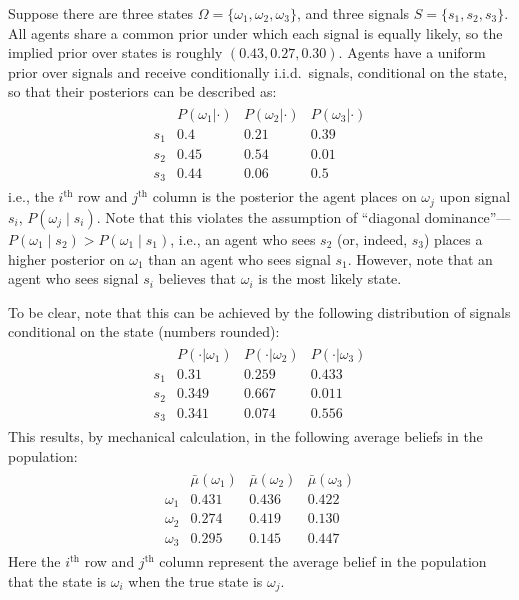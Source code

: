 \documentclass[12pt,reqno]{amsart}
\begin{document}
\begin{example}\label{ex}
Suppose there are three states $\Omega = \{\omega_1, \omega_2, \omega_3\}$, and three signals $S = \{s_1, s_2, s_3\}$.  All agents share a common prior under which each signal is equally likely, so the implied prior over states is roughly $(0.43,0.27,0.30)$. Agents have a uniform prior over signals and receive conditionally i.i.d.\ signals, conditional on the state, so that their posteriors can be described as:
\begin{align*}
    \begin{array}{c|ccc}
         & P(\omega_1|\cdot) & P(\omega_2|\cdot) & P(\omega_3|\cdot) \\\hline
        s_1  & 0.4 & 0.21 & 0.39 \\
        s_2 & 0.45 & 0.54 & 0.01 \\
        s_3 & 0.44 & 0.06 & 0.5
    \end{array}
\end{align*}
i.e., the $i^{\text{th}}$ row and $j^{\text{th}}$ column is the posterior the agent places on $\omega_j$ upon signal $s_i$, $P(\omega_j\mid s_i)$. Note that this violates the assumption of ``diagonal dominance''---$P(\omega_1\mid s_2) > P(\omega_1\mid s_1)$, i.e., an agent who sees $s_2$ (or, indeed, $s_3$) places a higher posterior on $\omega_1$ than an agent who sees signal $s_1$. However, note that an agent who sees signal $s_i$ believes that $\omega_i$ is the most likely state.

To be clear, note that this can be achieved by the following distribution of signals conditional on the state (numbers rounded):
 \begin{align*}
     \begin{array}{c|ccc}
         & P(\cdot|\omega_1) & P(\cdot|\omega_2) & P(\cdot|\omega_3) \\\hline
        s_1  & 0.31 & 0.259 & 0.433 \\
        s_2 & 0.349 & 0.667 & 0.011 \\
        s_3 & 0.341 & 0.074 & 0.556
    \end{array}
 \end{align*}   
This results, by mechanical calculation, in the following average beliefs in the population:
 \begin{align*}
     \begin{array}{c|ccc}
         & \bar{\mu}(\omega_1) & \bar{\mu}(\omega_2) & \bar{\mu}(\omega_3) \\\hline
        \omega_1  & 0.431 & 0.436 & 0.422 \\
        \omega_2 & 0.274 & 0.419 & 0.130 \\
        \omega_3 & 0.295 & 0.145 & 0.447
    \end{array}
 \end{align*}  
Here the $i^\text{th}$ row and $j^\text{th}$ column represent the average belief in the population that the state is $\omega_i$ when the true state is $\omega_j$.


\end{example}
\end{document}
